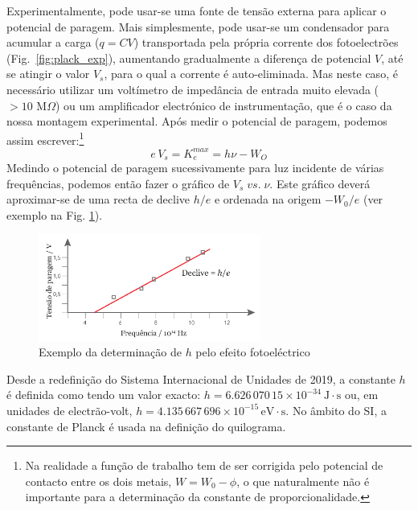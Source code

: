 \documentclass[12pt,a4paper,oneside]{paper}
\begin{document}
Experimentalmente, pode usar-se uma fonte de tensão externa para aplicar o potencial de paragem. Mais simplesmente,
pode usar-se um condensador para acumular a carga ($q=C V$) transportada pela própria corrente dos fotoelectrões (Fig.~\ref{fig:plack_exp}),
aumentando gradualmente a diferença de potencial $V$, até se atingir o valor $V_s$, para o qual a corrente é  auto-eliminada.
Mas neste caso, é necessário utilizar um voltímetro de impedância de entrada muito elevada ($> 10\textrm{ M}\Omega$) ou um
amplificador electrónico de instrumentação, que é o caso da nossa montagem experimental.
 Após medir o potencial de paragem, podemos assim escrever:\footnote{Na realidade a função de trabalho tem de ser corrigida
 pelo potencial de contacto entre os dois metais, $W=W_0 - \phi$, o que naturalmente não é importante para a determinação da
 constante de proporcionalidade.}
\begin{equation}
	\label{eq:energia}
	e\,V_s= K_e^{max}= h \nu - W_O
\end{equation}
Medindo o potencial de paragem sucessivamente para luz incidente de várias frequências, podemos então fazer o gráfico de
$V_s\; vs. \;\nu$. Este gráfico deverá aproximar-se de uma recta de declive $h/e$ e ordenada na origem  $-W_0/e$
(ver exemplo na Fig. \ref{fig:pe-graph}).


\begin{figure}[htb] 
	\centering 
	\includegraphics[width=0.65\textwidth]{./planck_images/pe-graph.pdf}
	\caption{Exemplo da determinação de $h$ pelo efeito fotoeléctrico} \label{fig:pe-graph}
\end{figure}

Desde a redefinição do Sistema Internacional de Unidades de 2019, a constante $h$ é definida como tendo um valor exacto:
$h=6.626\,070\,15 \times 10^{-34}\ \textrm{J}\cdot \textrm{s}$ ou, em unidades de electrão-volt,
$h=4.135\,667\,696\times 10^{-15}\,\textrm{eV}\cdot\textrm{s}$. No âmbito do SI, a constante de Planck é usada na definição
do quilograma.

\newpage
\end{document}
